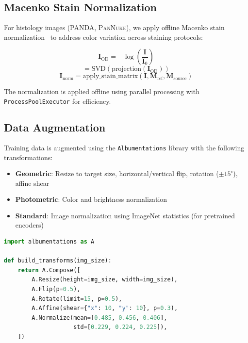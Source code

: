 \documentclass[11pt,a4paper,twoside]{report}
\newcommand{\dataset}[1]{\textsc{#1}}
\newcommand{\code}[1]{\texttt{#1}}
\begin{document}
\subsection{Macenko Stain Normalization}

For histology images (\dataset{PANDA}, \dataset{PanNuke}), we apply offline Macenko stain normalization~\cite{macenko2009stain} to address color variation across staining protocols:

\begin{equation}
\mathbf{I}_{\text{OD}} = -\log\left(\frac{\mathbf{I}}{\mathbf{I}_0}\right)
\end{equation}
\begin{equation}
[\mathbf{v}_1, \mathbf{v}_2] = \text{SVD}(\text{projection}(\mathbf{I}_{\text{OD}}))
\end{equation}
\begin{equation}
\mathbf{I}_{\text{norm}} = \text{apply\_stain\_matrix}(\mathbf{I}, \mathbf{M}_{\text{ref}}, \mathbf{M}_{\text{source}})
\end{equation}

The normalization is applied offline using parallel processing with \code{ProcessPoolExecutor} for efficiency.

\subsection{Data Augmentation}

Training data is augmented using the \code{Albumentations} library with the following transformations:

\begin{itemize}
    \item \textbf{Geometric}: Resize to target size, horizontal/vertical flip, rotation ($\pm 15^\circ$), affine shear
    \item \textbf{Photometric}: Color and brightness normalization
    \item \textbf{Standard}: Image normalization using ImageNet statistics (for pretrained encoders)
\end{itemize}

\begin{lstlisting}[language=Python, caption=Data augmentation pipeline]
import albumentations as A

def build_transforms(img_size):
    return A.Compose([
        A.Resize(height=img_size, width=img_size),
        A.Flip(p=0.5),
        A.Rotate(limit=15, p=0.5),
        A.Affine(shear={"x": 10, "y": 10}, p=0.3),
        A.Normalize(mean=[0.485, 0.456, 0.406],
                    std=[0.229, 0.224, 0.225]),
    ])
\end{lstlisting}
\end{document}
